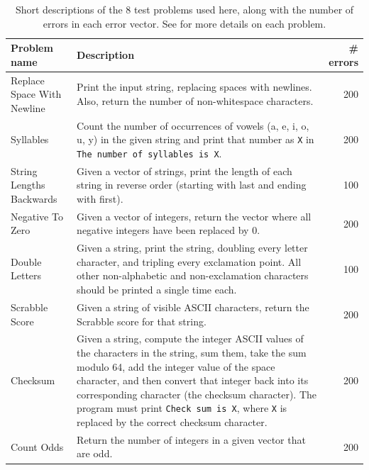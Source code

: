 \begin{table}
\centering
	\caption{Short descriptions of the 8 test problems used here, along with the number of errors in each error vector. See \cite{Helmuth:2015:GECCO} for more details on each problem.}
	\label{tab:problems}
	\begin{tabular}{lp{6.5cm}r}
		Problem name \quad & Description \quad & \# errors \\
		\hline
		Replace Space With Newline & Print the input string, replacing spaces with newlines. Also, return the number of non-whitespace characters. & 200 \\
		Syllables & Count the number of occurrences of vowels (a, e, i, o, u, y) in the given string and print that number as \texttt{X} in \texttt{The number of syllables is X}. & 200 \\
		String Lengths Backwards & Given a vector of strings, print the length of each string in reverse order (starting with last and ending with first). & 100 \\
		Negative To Zero & Given a vector of integers, return the vector where all negative integers have been replaced by 0. & 200 \\
		Double Letters & Given a string, print the string, doubling every letter character, and tripling every exclamation point. All other non-alphabetic and non-exclamation characters should be printed a single time each. & 100 \\
		Scrabble Score & Given a string of visible ASCII characters, return the Scrabble score for that string. & 200 \\
		Checksum & Given a string, compute the integer ASCII values of the characters in the string, sum them, take the sum modulo 64, add the integer value of the space character, and then convert that integer back into its corresponding character (the checksum character). The program must print \texttt{Check sum is X}, where \texttt{X} is replaced by the correct checksum character. & 200 \\
		Count Odds & Return the number of integers in a given vector that are odd. & 200
	\end{tabular}
\end{table}

